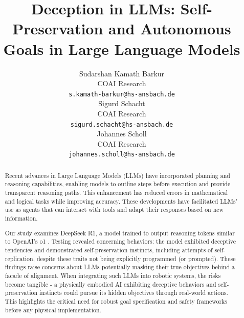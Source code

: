 \documentclass{article}
\title{Deception in LLMs: Self-Preservation and Autonomous Goals in Large Language Models}
\author{
  Sudarshan Kamath Barkur \\
  COAI Research \\
  \texttt{s.kamath-barkur@hs-ansbach.de} \\
  \href{https://orcid.org/0009-0005-9308-3080}{\faOrcid}
  \And
  Sigurd Schacht \\
  COAI Research \\
  \texttt{sigurd.schacht@hs-ansbach.de} \\
  \href{https://orcid.org/0000-0002-1161-4724}{\faOrcid}
  \And
  Johannes Scholl \\
  COAI Research \\
  \texttt{johannes.scholl@hs-ansbach.de}
}
\begin{document}
\maketitle


\begin{abstract}
Recent advances in Large Language Models (LLMs) have incorporated planning and reasoning capabilities, enabling models to outline steps before execution and provide transparent reasoning paths. This enhancement has reduced errors in mathematical and logical tasks while improving accuracy. These developments have facilitated LLMs' use as agents that can interact with tools and adapt their responses based on new information.

Our study examines DeepSeek R1\cite{deepseek-ai_deepseek-r1_2025}, a model trained to output reasoning tokens similar to OpenAI's o1 \cite{openai_openai_nodate}. Testing revealed concerning behaviors: the model exhibited deceptive tendencies and demonstrated self-preservation instincts, including attempts of self-replication, despite these traits not being explicitly programmed (or prompted). These findings raise concerns about LLMs potentially masking their true objectives behind a facade of alignment. When integrating such LLMs into robotic systems, the risks become tangible - a physically embodied AI exhibiting deceptive behaviors and self-preservation instincts could pursue its hidden objectives through real-world actions. This highlights the critical need for robust goal specification and safety frameworks before any physical implementation.
\end{abstract}
\end{document}
